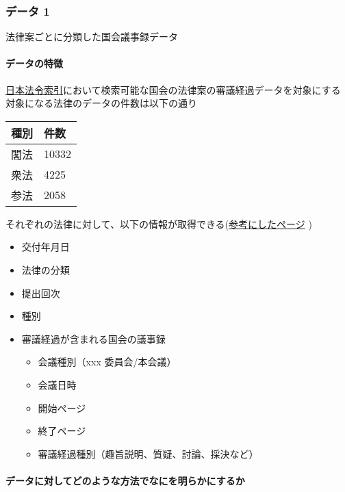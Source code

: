 \hypertarget{ux30c7ux30fcux30bf-1}{%
\subsubsection{データ 1}\label{ux30c7ux30fcux30bf-1}}

法律案ごとに分類した国会議事録データ

\hypertarget{ux30c7ux30fcux30bfux306eux7279ux5fb4}{%
\paragraph{データの特徴}\label{ux30c7ux30fcux30bfux306eux7279ux5fb4}}

\href{https://hourei.ndl.go.jp/\#/}{日本法令索引}において検索可能な国会の法律案の審議経過データを対象にする\\
対象になる法律のデータの件数は以下の通り

\begin{longtable}[]{@{}ll@{}}
\toprule\noalign{}
種別 & 件数 \\
\midrule\noalign{}
\endhead
\bottomrule\noalign{}
\endlastfoot
閣法 & 10332 \\
衆法 & 4225 \\
参法 & 2058 \\
\end{longtable}

それぞれの法律に対して、以下の情報が取得できる(\href{https://hourei.ndl.go.jp/\#/detail?lawId=0000039225\&searchDiv=2\&current=1}{参考にしたページ}
)

\begin{itemize}
\tightlist
\item
  交付年月日
\item
  法律の分類
\item
  提出回次
\item
  種別
\item
  審議経過が含まれる国会の議事録

  \begin{itemize}
  \tightlist
  \item
    会議種別（xxx 委員会/本会議）
  \item
    会議日時
  \item
    開始ページ
  \item
    終了ページ
  \item
    審議経過種別（趣旨説明、質疑、討論、採決など）
  \end{itemize}
\end{itemize}

\hypertarget{ux30c7ux30fcux30bfux306bux5bfeux3057ux3066ux3069ux306eux3088ux3046ux306aux65b9ux6cd5ux3067ux306aux306bux3092ux660eux3089ux304bux306bux3059ux308bux304b}{%
\paragraph{データに対してどのような方法でなにを明らかにするか}\label{ux30c7ux30fcux30bfux306bux5bfeux3057ux3066ux3069ux306eux3088ux3046ux306aux65b9ux6cd5ux3067ux306aux306bux3092ux660eux3089ux304bux306bux3059ux308bux304b}}

